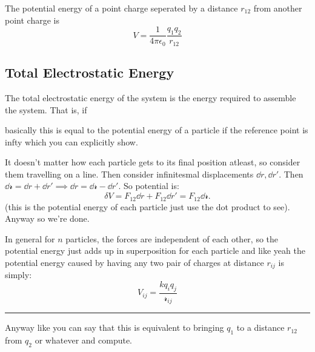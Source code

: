 The potential energy of a point charge seperated by a distance $r_{12}$ from another point charge is
\[
V = \frac{1}{4\pi\epsilon_0} \frac{q_1q_2}{r_{12}}
\] 

\subsection{Total Electrostatic Energy}

The total electrostatic energy of the system is the energy required to assemble the system. That is, if 

basically this is equal to the potential energy of a particle if the reference point is infty which you can 
explicitly show.

It doesn't matter how each particle gets to its final position atleast, so consider them travelling 
on a line. Then consider infinitesmal displacements $\dd{r}, \dd{r}'$. Then $\dd{\mathscr{r}} = \dd{r} + \dd{r}' \implies 
\dd{r} = \dd{\mathscr{r}} - \dd{r}'$. So potential is:
\[
\delta V = F_{12} \dd{r}  + F_{12} \dd{r}' = F_{12} \dd{\mathscr{r}}. 
\]
(this is the potential energy of each particle just use the dot product to see). 
Anyway so we're done.

In general for $n$ particles, the forces are independent of each other, so the potential energy just adds up in 
superposition for each particle and like yeah the potential energy caused by having any two pair of charges 
at distance $r_{ij}$ is simply:
\[
V_{ij} = \frac{kq_iq_j}{\mathscr{r}_{ij}}
\]

\hrule

Anyway like you can say that this is equivalent to bringing $q_1$ to a distance $r_{12}$ from $q_2$ or whatever and compute.
